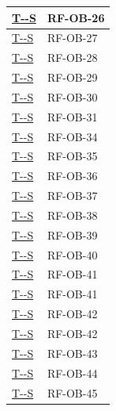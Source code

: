 \documentclass[a4paper,12pt]{article}
\newcounter{testsys}
\newcommand{\systestref}{%
  \hyperlink{T-\arabic{testsys}-S}{T-\arabic{testsys}-S}%
}
\begin{document}
\begin{longtable}{|>{\centering\arraybackslash}p{5cm}|>{\centering\arraybackslash}p{9cm}|}
\stepcounter{testsys}
\systestref & RF-OB-26 \\
\hline

\stepcounter{testsys}
\systestref & RF-OB-27 \\
\hline

\stepcounter{testsys}
\systestref & RF-OB-28 \\
\hline

\stepcounter{testsys}
\systestref & RF-OB-29 \\
\hline

\stepcounter{testsys}
\systestref & RF-OB-30 \\
\hline

\stepcounter{testsys}
\systestref & RF-OB-31 \\
\hline

\stepcounter{testsys}
\systestref & RF-OB-34 \\
\hline

\stepcounter{testsys}
\systestref & RF-OB-35 \\
\hline

\stepcounter{testsys}
\systestref & RF-OB-36 \\
\hline

\stepcounter{testsys}
\systestref & RF-OB-37 \\
\hline

\stepcounter{testsys}
\systestref & RF-OB-38 \\
\hline

\stepcounter{testsys}
\systestref & RF-OB-39 \\
\hline

\stepcounter{testsys}
\systestref & RF-OB-40 \\
\hline

\stepcounter{testsys}
\systestref & RF-OB-41 \\
\hline

\stepcounter{testsys}
\systestref & RF-OB-41 \\
\hline

\stepcounter{testsys}
\systestref & RF-OB-42 \\
\hline

\stepcounter{testsys}
\systestref & RF-OB-42 \\
\hline

\stepcounter{testsys}
\systestref & RF-OB-43 \\
\hline

\stepcounter{testsys}
\systestref & RF-OB-44 \\
\hline

\stepcounter{testsys}
\systestref & RF-OB-45 \\
\hline


\end{longtable}
\end{document}
